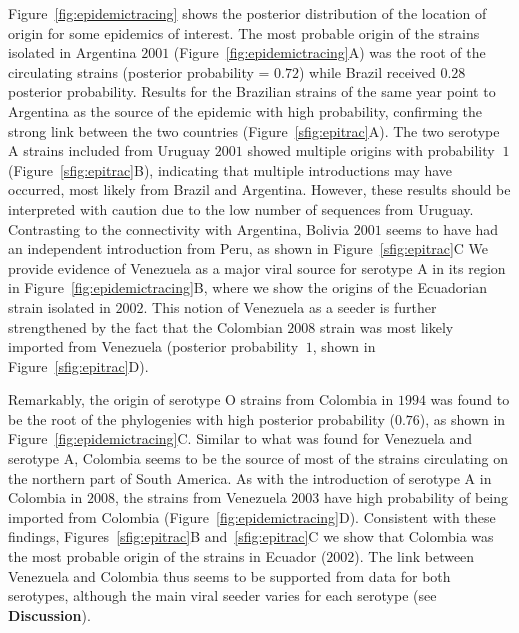 \documentclass[10pt]{article}
\begin{document}
Figure~\ref{fig:epidemictracing} shows the posterior distribution of the  location of origin for some epidemics of interest.
The most probable origin of the strains isolated in Argentina $2001$ (Figure~\ref{fig:epidemictracing}A) was the root of the circulating strains (posterior probability = $0.72$) while Brazil received $0.28$ posterior probability.
Results for the Brazilian strains of the same year point to Argentina as the source of the epidemic with high probability, confirming the strong link between the two countries (Figure~\ref{sfig:epitrac}A).
The two serotype A strains included from Uruguay $2001$ showed multiple origins with probability $~1$ (Figure~\ref{sfig:epitrac}B), indicating that multiple introductions may have occurred, most likely from Brazil and Argentina.
However, these results should be interpreted with caution due to the low number of sequences from Uruguay.
Contrasting to the connectivity with Argentina, Bolivia $2001$ seems to have had an independent introduction from Peru, as shown in Figure~\ref{sfig:epitrac}C
We provide evidence of Venezuela as a major viral source for serotype A in its region in Figure~\ref{fig:epidemictracing}B, where we show the origins of the Ecuadorian strain isolated in $2002$.
This notion of Venezuela as a seeder is further strengthened by the fact that the Colombian $2008$ strain was most likely imported from Venezuela (posterior probability $~1$, shown in Figure~\ref{sfig:epitrac}D).

Remarkably, the origin of serotype O strains from Colombia in $1994$ was found to be the root of the phylogenies with high posterior probability ($0.76$), as shown in Figure~\ref{fig:epidemictracing}C.
Similar to what was found for Venezuela and serotype A, Colombia seems to be the source of most of the strains circulating on the northern part of South America.
As with the introduction of serotype A in Colombia in $2008$, the strains from Venezuela $2003$ have high probability of being imported from Colombia (Figure~\ref{fig:epidemictracing}D).
Consistent with these findings, Figures~\ref{sfig:epitrac}B and~\ref{sfig:epitrac}C we show that Colombia was the most probable origin of the strains in Ecuador ($2002$).
The link between Venezuela and Colombia thus seems to be supported from data for both serotypes, although the main viral seeder varies for each serotype (see \textbf{Discussion}).
\end{document}
